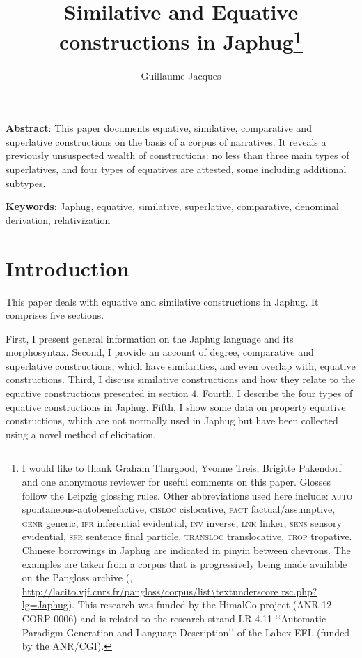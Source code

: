 \documentclass[oneside,a4paper,11pt]{article}
\begin{document}
 

\title{Similative and Equative constructions in Japhug\footnote{ I would like to thank Graham Thurgood, Yvonne Treis, Brigitte Pakendorf and one anonymous reviewer for useful comments on this paper. Glosses follow the Leipzig glossing rules. Other abbreviations used here include: \textsc{auto} spontaneous-autobenefactive, \textsc{cisloc} cislocative,  \textsc{fact} factual/assumptive, \textsc{genr} generic, \textsc{ifr} inferential evidential,  \textsc{inv} inverse, \textsc{lnk} linker,  \textsc{sens} sensory  evidential, \textsc{sfr} sentence final particle, \textsc{transloc} translocative, \textsc{trop} tropative.  Chinese borrowings in Japhug are indicated in pinyin between chevrons. The examples are taken from a corpus that is progressively being made available on the Pangloss archive (\citealt{michailovsky14pangloss}, 
 \url{http://lacito.vjf.cnrs.fr/pangloss/corpus/list\textunderscore rsc.php?lg=Japhug}). This research was funded by the HimalCo project (ANR-12-CORP-0006) and is related to the research strand LR-4.11 ‘‘Automatic Paradigm Generation and Language Description’’ of the Labex EFL (funded by the ANR/CGI).}}
\author{Guillaume Jacques}
\maketitle

\textbf{Abstract}: This paper documents equative, similative, comparative and superlative constructions on the basis of a corpus of narratives. It reveals a previously unsuspected wealth of constructions: no less than three main types of superlatives, and four types of equatives are attested, some including additional subtypes.
 
\textbf{Keywords}: Japhug, equative, similative, superlative, comparative, denominal derivation, relativization
\section*{Introduction}
This paper deals with equative and similative constructions in Japhug. It comprises five sections.

 First, I present general information on the Japhug language and its morphosyntax. Second, I provide an account of degree, comparative and superlative constructions, which have similarities, and even overlap with, equative constructions. Third, I discuss similative constructions and how they relate to the equative constructions presented in section 4. Fourth, I describe the four types of equative constructions in Japhug. Fifth, I show some data on property equative constructions, which are not normally used in Japhug but have been collected using a novel method of elicitation.    
\end{document}
